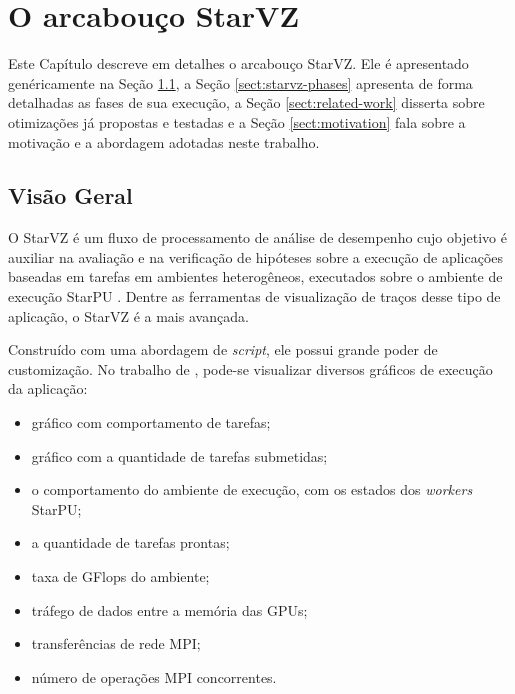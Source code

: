 \chapter{O arcabouço StarVZ} \label{ch:starvz}

Este Capítulo descreve em detalhes o arcabouço StarVZ. Ele é 
apresentado genéricamente na Seção \ref{sect:starvz-overview}, a Seção 
\ref{sect:starvz-phases} apresenta de forma detalhadas as fases de sua 
execução, a Seção \ref{sect:related-work} disserta sobre otimizações já 
propostas e testadas e a Seção \ref{sect:motivation} fala sobre a motivação e a 
abordagem adotadas neste trabalho.

\section{Visão Geral}\label{sect:starvz-overview}

O StarVZ \cite{ref:starvz} é um fluxo de processamento de análise de desempenho 
cujo objetivo é auxiliar na avaliação e na verificação de hipóteses sobre a 
execução de aplicações baseadas em tarefas em ambientes heterogêneos, executados 
sobre o ambiente de execução StarPU \cite{ref:starpu}. Dentre as ferramentas de 
visualização de traços desse tipo de aplicação, o StarVZ é a mais avançada. 

Construído com uma abordagem de \textit{script}, ele possui grande poder de customização.
No trabalho de \citet{ref:starvz}, pode-se visualizar diversos gráficos de execução da aplicação:

\begin{itemize}
    \item gráfico com comportamento de tarefas;
    \item gráfico com a quantidade de tarefas submetidas;
    \item o comportamento do ambiente de execução, com os estados dos 
\emph{workers} StarPU;
    \item a quantidade de tarefas prontas;
    \item taxa de GFlops do ambiente;
    \item tráfego de dados entre a memória das GPUs;
    \item transferências de rede MPI;
    \item número de operações MPI concorrentes.
\end{itemize}

